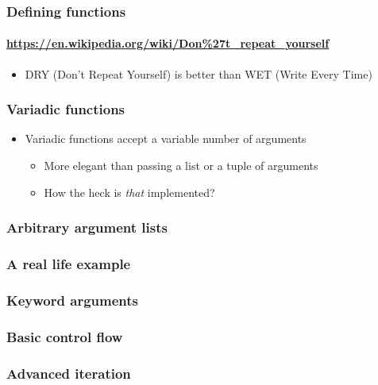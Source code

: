 \documentclass[9pt]{beamer}
\begin{document}
\begin{frame}
  \frametitle{Defining functions}
  \framesubtitle{\url{https://en.wikipedia.org/wiki/Don\%27t_repeat_yourself}}
  \begin{itemize}
  \item\alert{DRY (Don't Repeat Yourself) is better than WET (Write Every Time)}
  \end{itemize}

  \bigskip

  
\end{frame}


\begin{frame}
  \frametitle{Variadic functions}
  \begin{itemize}
  \item Variadic functions accept a variable number of arguments
    \begin{itemize}
    \item More elegant than passing a list or a tuple of arguments
    \item How the heck is \emph{that} implemented?
    \end{itemize}
  \end{itemize}

  \bigskip

  
\end{frame}


\begin{frame}
  \frametitle{Arbitrary argument lists}
  
\end{frame}


\begin{frame}
  \frametitle{A real life example}
  
\end{frame}


\begin{frame}
  \frametitle{Keyword arguments}
  
  
\end{frame}


\begin{frame}
  \frametitle{Basic control flow}
  
\end{frame}


\begin{frame}
  \frametitle{Advanced iteration}
  
\end{frame}
\end{document}
